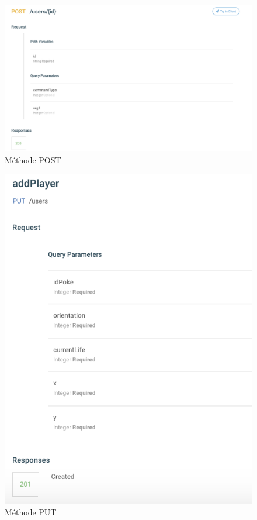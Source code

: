 \documentclass[a4paper,12pt]{article}
\begin{document}
    \begin{figure}[p]
    \includegraphics{POST.png}
    \caption{\label{uml:module}Méthode POST}
    \end{figure}
    
    \begin{figure}[p]
    \includegraphics{PUT.png}
    \caption{\label{uml:module}Méthode PUT}
    \end{figure}
    
\end{document}
